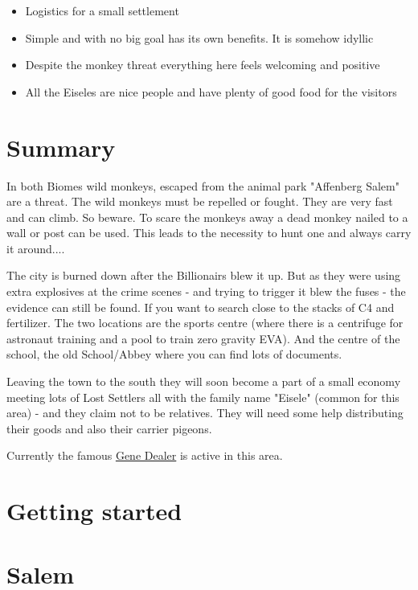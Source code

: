 \begin{itemize}
    \item Logistics for a small settlement
    \item Simple and with no big goal has its own benefits. It is somehow idyllic
    \item Despite the monkey threat everything here feels welcoming and positive
    \item All the Eiseles are nice people and have plenty of good food for the visitors
\end{itemize}

\section{Summary}

In both Biomes wild monkeys, escaped from the animal park "Affenberg Salem" are a threat. The wild monkeys must be repelled or fought. They are very fast and can climb. So beware. To scare the monkeys away a dead monkey nailed to a wall or post can be used. This leads to the necessity to hunt one and always carry it around....

The city is burned down after the Billionairs blew it up. But as they were using extra explosives at the crime scenes - and trying to trigger it blew the fuses - the evidence can still be found. If you want to search close to the stacks of C4 and fertilizer. The two locations are the sports centre (where there is a centrifuge for astronaut training and a pool to train zero gravity EVA). And the centre of the school, the old School/Abbey where you can find lots of documents.

Leaving the town to the south they will soon become a part of a small economy meeting lots of Lost Settlers all with the family name "Eisele" (common for this area) - and they claim not to be relatives.
They will need some help distributing their goods and also their carrier pigeons.

Currently the famous \hyperref[sec:Gene Dealer]{Gene Dealer} is active in this area.

\section{Getting started}

\section{Salem}

